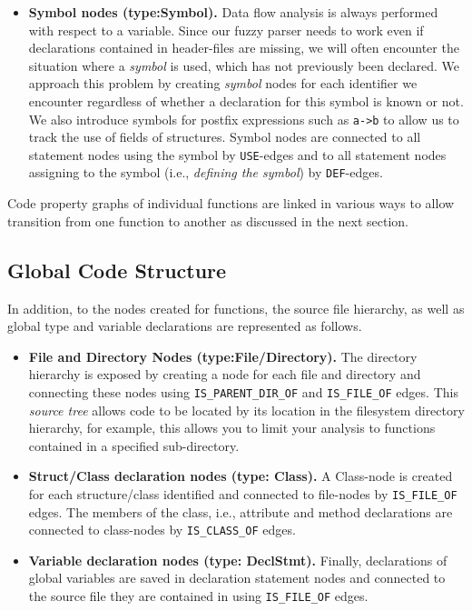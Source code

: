 \documentclass[a4paper]{article}
\newcommand{\code}[1]{\texttt{\small #1}}
\begin{document}
\begin{itemize}
  \item \textbf{Symbol nodes (type:Symbol).} Data flow analysis is always
    performed with respect to a variable. Since our fuzzy parser needs
    to work even if declarations contained in header-files are missing,
    we will often encounter the situation where a \emph{symbol} is used,
    which has not previously been declared. We approach this problem by
    creating \emph{symbol} nodes for each identifier we encounter regardless
    of whether a declaration for this symbol is known or not. We also
    introduce symbols for postfix expressions such as \code{a->b} to allow us
    to track the use of fields of structures. Symbol nodes are connected
    to all statement nodes using the symbol by \code{USE}-edges and to all
    statement nodes assigning to the symbol (i.e., \emph{defining
      the symbol}) by \code{DEF}-edges.
    
\end{itemize}

Code property graphs of individual functions are linked in various
ways to allow transition from one function to another as discussed in
the next section.

\subsection{Global Code Structure}

In addition, to the nodes created for functions, the source file
hierarchy, as well as global type and variable declarations are
represented as follows.

\begin{itemize}
  
\item \textbf{File and Directory Nodes (type:File/Directory).} The
  directory hierarchy is exposed by creating a node for each file and
  directory and connecting these nodes using \code{IS\_PARENT\_DIR\_OF} and
  \code{IS\_FILE\_OF} edges. This \emph{source tree} allows code to
  be located by its location in the filesystem directory hierarchy,
  for example, this allows you to limit your analysis to functions
  contained in a specified sub-directory.
  
\item \textbf{Struct/Class declaration nodes (type: Class).} A
  Class-node is created for each structure/class identified and
  connected to file-nodes by \code{IS\_FILE\_OF} edges. The members
  of the class, i.e., attribute and method declarations are
  connected to class-nodes by \code{IS\_CLASS\_OF} edges.
  
\item \textbf{Variable declaration nodes (type: DeclStmt).} Finally,
  declarations of global variables are saved in declaration statement
  nodes and connected to the source file they are contained in using
  \code{IS\_FILE\_OF} edges.
  
\end{itemize}
\end{document}
